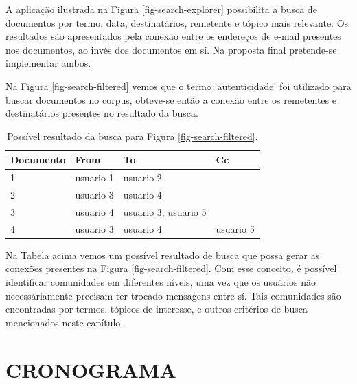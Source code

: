 \documentclass[12pt,a4paper]{article}
\begin{document}
A aplicação ilustrada na Figura \ref{fig-search-explorer} possibilita a busca de documentos por termo, data,
 destinatários, remetente e tópico mais relevante. Os resultados são apresentados pela conexão entre os
 endereços de e-mail presentes nos documentos, ao invés dos documentos em sí. Na proposta final pretende-se implementar ambos.

Na Figura \ref{fig-search-filtered} vemos que o termo 'autenticidade' foi utilizado para buscar documentos no corpus,
 obteve-se então a conexão entre os remetentes e destinatários presentes no resultado da busca.

\begin{table}[H]
  \centering
  \begin{tabular}{llll}
  Documento     & From                       & To                         & Cc         \\
  \hline
  1             & usuario 1                  & usuario 2                  &            \\
  2             & usuario 3                  & usuario 4                  &            \\
  3             & usuario 4                  & usuario 3, usuario 5       &             \\
  4             & usuario 3                  & usuario 4                  & usuario 5             \\
  \hline
  \end{tabular}
  \caption{Possível resultado da busca para Figura \ref{fig-search-filtered}.}
  \label{tab-nich-documents}
\end{table}

Na Tabela acima vemos um possível resultado de busca que possa gerar as conexões presentes na Figura \ref{fig-search-filtered}.
 Com esse conceito, é possível identificar comunidades em diferentes níveis, uma vez que os usuários não necessáriamente precisam ter trocado mensagens entre sí. Tais 
 comunidades são encontradas por termos, tópicos de interesse, e outros critérios de busca mencionados neste capítulo.

\section{CRONOGRAMA}
\end{document}
